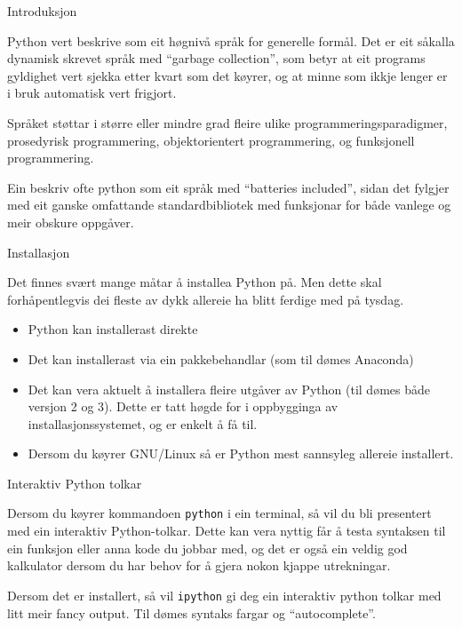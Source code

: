 \begin{frame}{Introduksjon}
	
	
	Python vert beskrive som eit høgnivå språk for generelle formål. Det er eit såkalla dynamisk skrevet språk med ``garbage collection'', som betyr at eit programs gyldighet vert sjekka etter kvart som det køyrer, og at minne som ikkje lenger er i bruk automatisk vert frigjort.
	
	Språket støttar i større eller mindre grad fleire ulike programmeringsparadigmer, prosedyrisk programmering, objektorientert programmering, og funksjonell programmering.
	
	Ein beskriv ofte python som eit språk med ``batteries included'', sidan det fylgjer med eit ganske omfattande standardbibliotek med funksjonar for både vanlege og meir obskure oppgåver.
	
\end{frame}


\begin{frame}{Installasjon}

  Det finnes svært mange måtar å installea Python på. Men dette skal forhåpentlegvis dei fleste av dykk allereie ha blitt ferdige med på tysdag.
  
  \begin{itemize}
  	\item Python kan installerast direkte
  	\item Det kan installerast via ein pakkebehandlar (som til dømes Anaconda)
  	\item Det kan vera aktuelt å installera fleire utgåver av Python (til dømes både versjon 2 og 3). Dette er tatt høgde for i oppbygginga av installasjonssystemet, og er enkelt å få til.
  	\item Dersom du køyrer GNU/Linux så er Python mest sannsyleg allereie installert.
  \end{itemize}
  

  
\end{frame}

\begin{frame}{Interaktiv Python tolkar}

  Dersom du køyrer kommandoen \texttt{python} i ein terminal, så vil du bli presentert med ein interaktiv Python-tolkar. Dette kan vera nyttig får å testa syntaksen til ein funksjon eller anna kode du jobbar med, og det er også ein veldig god kalkulator dersom du har behov for å gjera nokon kjappe utrekningar.

Dersom det er installert, så vil \texttt{ipython} gi deg ein interaktiv python tolkar med litt meir fancy output. Til dømes syntaks fargar og ``autocomplete''.
  
\end{frame}

